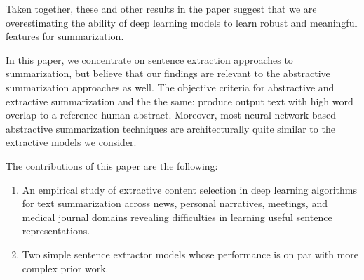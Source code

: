Taken together, these and other results in the paper suggest that we are 
overestimating the ability of deep learning models to learn robust and 
meaningful features for summarization. 

In this paper, we concentrate on sentence extraction approaches to summarization,
but believe that our findings are relevant to the abstractive summarization approaches as well.
The objective criteria for abstractive and extractive summarization and the the same:
produce output text with high word overlap to a reference human abstract. 
Moreover, most neural network-based abstractive summarization techniques are architecturally quite similar to
the extractive models we consider.

The contributions of this paper are the following:
\begin{enumerate}
    \item An empirical study of extractive content selection in 
        deep learning 
        algorithms for text summarization across news, personal narratives, 
         meetings, and
         medical journal domains revealing difficulties in learning
         useful sentence representations.

    \item Two simple sentence extractor models whose performance is 
          on par 
          with more complex prior work.
\end{enumerate}



